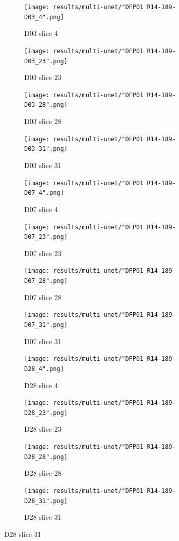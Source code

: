 \begin{figure}[!htb]  
    \centering %
\begin{subfigure}{0.25\textwidth}
  \texttt{[image: results/multi-unet/"DFP01 R14-189-D03\_4".png]}
  \caption{D03 slice 4} 
\end{subfigure}\hfil %
\begin{subfigure}{0.25\textwidth}
  \texttt{[image: results/multi-unet/"DFP01 R14-189-D03\_23".png]}
  \caption{D03 slice 23}
\end{subfigure}\hfil %
\begin{subfigure}{0.25\textwidth}
  \texttt{[image: results/multi-unet/"DFP01 R14-189-D03\_28".png]}
  \caption{D03 slice 28}
\end{subfigure}\hfil %
\begin{subfigure}{0.25\textwidth}
  \texttt{[image: results/multi-unet/"DFP01 R14-189-D03\_31".png]}
  \caption{D03 slice 31}
\end{subfigure}


\medskip
\begin{subfigure}{0.25\textwidth}
  \texttt{[image: results/multi-unet/"DFP01 R14-189-D07\_4".png]}
  \caption{D07 slice 4}
\end{subfigure}\hfil %
\begin{subfigure}{0.25\textwidth}
  \texttt{[image: results/multi-unet/"DFP01 R14-189-D07\_23".png]}
  \caption{D07 slice 23}
\end{subfigure}\hfil %
\begin{subfigure}{0.25\textwidth}
  \texttt{[image: results/multi-unet/"DFP01 R14-189-D07\_28".png]}
  \caption{D07 slice 28}
\end{subfigure}\hfil %
\begin{subfigure}{0.25\textwidth}
  \texttt{[image: results/multi-unet/"DFP01 R14-189-D07\_31".png]}
  \caption{D07 slice 31}
\end{subfigure}


\medskip
\begin{subfigure}{0.25\textwidth}
  \texttt{[image: results/multi-unet/"DFP01 R14-189-D28\_4".png]}
  \caption{D28 slice 4}
\end{subfigure}\hfil %
\begin{subfigure}{0.25\textwidth}
  \texttt{[image: results/multi-unet/"DFP01 R14-189-D28\_23".png]}
  \caption{D28 slice 23}
\end{subfigure}\hfil %
\begin{subfigure}{0.25\textwidth}
  \texttt{[image: results/multi-unet/"DFP01 R14-189-D28\_28".png]}
  \caption{D28 slice 28}
\end{subfigure}\hfil %
\begin{subfigure}{0.25\textwidth}
  \texttt{[image: results/multi-unet/"DFP01 R14-189-D28\_31".png]}
  \caption{D28 slice 31}
\end{subfigure}
  

\end{figure}
